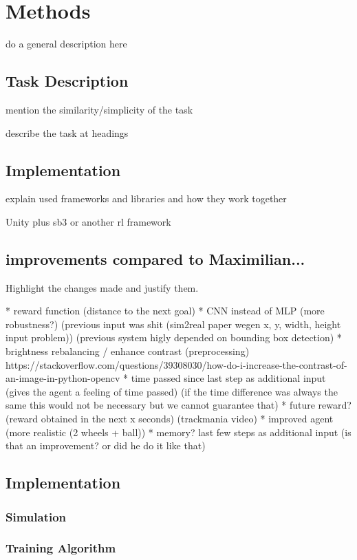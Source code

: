 \chapter{Methods}
\label{cha:Methods}

do a general description here


\section{Task Description}

mention the similarity/simplicity of the task

describe the task at headings


\section{Implementation}

explain used frameworks and libraries and how they work together

Unity plus sb3 or another rl framework 





\section{improvements compared to Maximilian...}

Highlight the changes made and justify them.

* reward function (distance to the next goal)
* CNN instead of MLP (more robustness?) (previous input was shit (sim2real paper wegen x, y, width, height input problem)) (previous system higly depended on bounding box detection)
* brightness rebalancing / enhance contrast (preprocessing) https://stackoverflow.com/questions/39308030/how-do-i-increase-the-contrast-of-an-image-in-python-opencv
* time passed since last step as additional input (gives the agent a feeling of time passed) (if the time difference was always the same this would not be necessary but we cannot guarantee that)
* future reward? (reward obtained in the next x seconds) (trackmania video)
* improved agent (more realistic (2 wheels + ball))
* memory? last few steps as additional input (is that an improvement? or did he do it like that)



\section{Implementation}
\subsection{Simulation}

\subsection{Training Algorithm}



